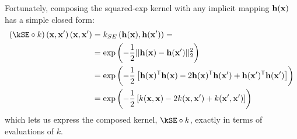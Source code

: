 Fortunately, composing the squared-exp kernel with any implicit mapping ${\bf{h}}({\bf{x}})$ has a simple closed form:
%
\begin{align}
\left( \kSE \circ k \right)(\vx, \vx') \left( \vx, \vx' \right) & = k_{SE} \left( \hPhi(\vx), \hPhi(\vx') \right) =  \\
& = \exp \left( -\frac{1}{2} || \hPhi(\vx) - \hPhi(\vx')||_2^2 \right) \nonumber\\
& = \exp\left ( -\frac{1}{2} \left[ \hPhi(\vx) \tra \hPhi(\vx) - 2 \hPhi(\vx) \tra \hPhi(\vx') + \hPhi(\vx') \tra \hPhi(\vx') \right] \right) \nonumber \\
& = \exp \left( -\frac{1}{2} \left[ k(\vx, \vx) - 2 k(\vx, \vx') + k(\vx', \vx') \right] \right) \nonumber
\end{align}
%
%
%
which lets us express the composed kernel, $\kSE \circ k$, exactly in terms of evaluations of $k$.

